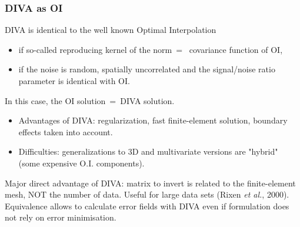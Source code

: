 \begin{frame}
\frametitle{DIVA as OI}

\vspace{-.5cm}
DIVA is identical to the well known Optimal Interpolation
\begin{itemize}
\item
if so-called reproducing kernel of the norm$~=~$ covariance function of OI, 
\item
if the noise is random, spatially uncorrelated and the signal/noise ratio parameter is identical with OI.
\end{itemize}
In this case, the OI solution$~=~$DIVA solution.
\begin{itemize}
\item Advantages of DIVA: regularization, fast finite-element solution, boundary effects taken into account.
\item Difficulties: generalizations to 3D and multivariate versions are "hybrid" (some expensive O.I. components).
\end{itemize}
Major direct advantage of DIVA: matrix to invert is related to the finite-element mesh, NOT the number of data. Useful for large data sets (Rixen {\it et al.}, 2000).
Equivalence allows to calculate error fields with DIVA even if formulation does not rely on error minimisation.
\end{frame}


